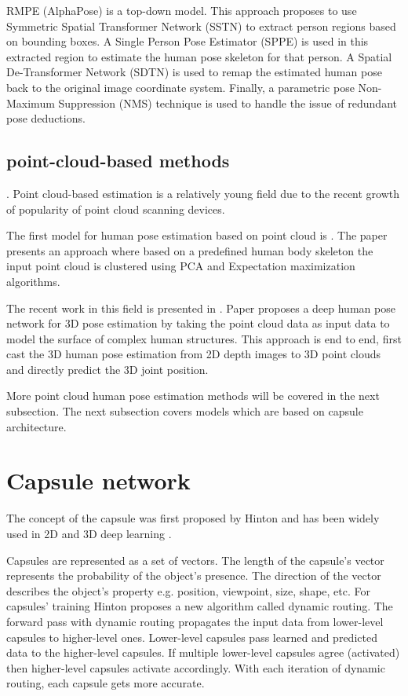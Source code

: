 RMPE (AlphaPose) \parencite{fang_rmpe_2018} is a top-down model. This approach proposes to use Symmetric Spatial Transformer Network (SSTN) to extract person regions based on bounding boxes. A Single Person Pose Estimator (SPPE) is used in this extracted region to estimate the human pose skeleton for that person. A Spatial De-Transformer Network (SDTN) is used to remap the estimated human pose back to the original image coordinate system. Finally, a parametric pose Non-Maximum Suppression (NMS) technique is used to handle the issue of redundant pose deductions.

\subsection{point-cloud-based methods}. Point cloud-based estimation is a relatively young field due to the recent growth of popularity of point cloud scanning devices.

The first model for human pose estimation based on point cloud is \parencite{diaz_barros_real-time_2015}. The paper presents an approach where based on a predefined human body skeleton the input point cloud is clustered using PCA and Expectation maximization algorithms.

The recent work in this field is presented in \parencite{zhou_learning_2020}. Paper proposes a deep human pose network for 3D pose estimation by taking the point cloud data as input data to model the surface of complex human structures. This approach is end to end, first cast the 3D human pose estimation from 2D depth images to 3D point clouds and directly predict the 3D joint position.

More point cloud human pose estimation methods will be covered in the next subsection. The next subsection covers models which are based on capsule architecture.

\section{Capsule network}
\label{Capsule network}
The concept of the capsule was first proposed by Hinton \parencite{sabour_dynamic_2017} and has been widely used in 2D and 3D deep learning \parencite{kakillioglu_3d_2020, qin_detecting_2020, duarte_videocapsulenet_2018, lalonde_capsules_2018}.

Capsules are represented as a set of vectors. The length of the capsule's vector represents the probability of the object's presence. The direction of the vector describes the object's property e.g. position, viewpoint, size, shape, etc. For capsules' training Hinton proposes a new algorithm \parencite{sabour_dynamic_2017} called dynamic routing. The forward pass with dynamic routing propagates the input data from lower-level capsules to higher-level ones. Lower-level capsules pass learned and predicted data to the higher-level capsules. If multiple lower-level capsules agree (activated) then higher-level capsules activate accordingly. With each iteration of dynamic routing, each capsule gets more accurate.


